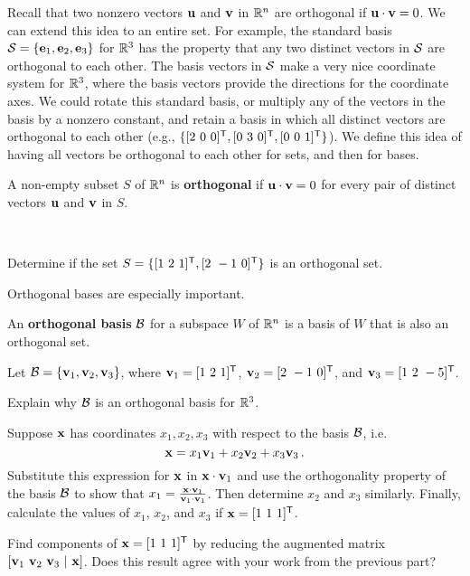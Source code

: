 Recall that two nonzero vectors $\mathbf{u}$ and $\mathbf{v}$ in $\mathbb{R}^n$ are orthogonal if $\mathbf{u} \cdot \mathbf{v} = 0$. We can extend this idea to an entire set. For example, the standard basis $\mathcal{S} = \{\mathbf{e}_1, \mathbf{e}_2, \mathbf{e}_3\}$ for $\mathbb{R}^3$ has the property that any two distinct vectors in $\mathcal{S}$ are orthogonal to each other. The basis vectors in $\mathcal{S}$ make a very nice coordinate system for $\mathbb{R}^3$, where the basis vectors provide the directions for the coordinate axes. We could rotate this standard basis, or multiply any of the vectors in the basis by a nonzero constant, and retain a basis in which all distinct vectors are orthogonal to each other (e.g., $\{[2 \ 0 \ 0]^{\tr}, [0 \ 3 \ 0]^{\tr}, [0 \ 0 \ 1]^{\tr}\}$). We define this idea of having all vectors be orthogonal to each other for sets, and then for bases.

\begin{definition} \label{def:6_b_orthogonal_set_Rn} A non-empty subset $S$ of $\mathbb{R}^n$ is \textbf{orthogonal} if $\mathbf{u} \cdot \mathbf{v} = 0$ for every pair of distinct vectors $\mathbf{u}$ and $\mathbf{v}$ in $S$.
\end{definition}

\begin{pa} \label{pa:6_b} ~
\be
\item Determine if the set $S = \{[1 \ 2 \ 1]^{\tr}, [2 \ -1 \ 0]^{\tr}\}$ is an orthogonal set.


\item Orthogonal bases are especially important.

\begin{definition} \label{def:6_b_orthogonal_basis_Rn} An \textbf{orthogonal basis} $\mathcal{B}$ for a subspace $W$ of $\mathbb{R}^n$ is a basis of $W$ that is also an orthogonal set.
\end{definition}

Let $\mathcal{B} = \{\mathbf{v}_1, \mathbf{v}_2, \mathbf{v}_3\}$, where $\mathbf{v}_1 = [1 \ 2 \ 1]^{\mathsf{T}}$, $\mathbf{v}_2 = [2 \ -1 \ 0]^{\mathsf{T}}$, and $\mathbf{v}_3 = [1 \ 2 \ -5]^{\mathsf{T}}$. 
    \ba
    \item Explain why $\mathcal{B}$ is an orthogonal basis for $\mathbb{R}^3$.


    \item Suppose $\mathbf{x}$ has coordinates $x_1, x_2, x_3$ with respect to the basis $\mathcal{B}$, i.e. 
\[ \mathbf{x} = x_1 \mathbf{v}_1 + x_2 \mathbf{v}_2 + x_3 \mathbf{v}_3 \,.\]
Substitute this expression for $\mathbf{x}$ in $\mathbf{x} \cdot \mathbf{v}_1$ and use the orthogonality property of the basis $\mathcal{B}$ to show that $x_1 = \frac{\mathbf{x} \cdot \mathbf{v}_1}{\mathbf{v}_1 \cdot \mathbf{v}_1}$. Then determine $x_2$ and $x_3$ similarly. Finally, calculate the values of $x_1$, $x_2$, and $x_3$ if $\vx = [1 \ 1 \ 1]^{\tr}$. 


   \item Find components of $\vx = [1 \ 1 \ 1]^{\tr}$ by reducing the augmented matrix $[\mathbf{v}_1 \   \mathbf{v}_2 \  \mathbf{v}_3 \ | \ \mathbf{x}]$. Does this result agree with your work from the previous part?

    \ea

\ee

\end{pa}


